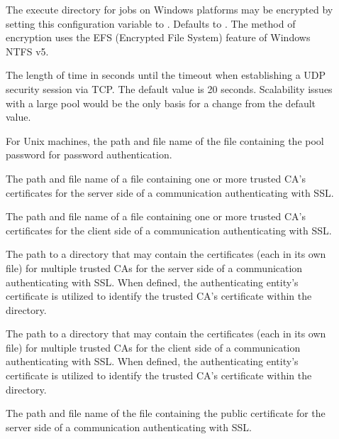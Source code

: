 \begin{description}
\item[]
\label{param:EncryptExecuteDirectory}
The execute directory for jobs on Windows platforms may be
encrypted by setting this configuration variable to .
Defaults to .
The method of encryption uses the EFS (Encrypted File System)
feature of Windows NTFS v5.

\item[]
\label{param:SecTCPSessionTimeout}
The length of time in seconds until the timeout
when establishing a UDP security session via TCP.
The default value is 20 seconds.
Scalability issues with a large pool would be the only basis
for a change from the default value.

\item[]
\label{param:SecPasswordFile} For Unix machines, the path and file name
of  the file containing the pool password for password authentication.


\item[]
\label{param:AuthSSLServerCAFile}  The path and file name of
a file containing one or more trusted CA's certificates
for the server side of a communication authenticating 
with SSL.

\item[]
\label{param:AuthSSLClientCAFile} The path and file name of
a file containing one or more trusted CA's certificates
for the client side of a communication authenticating 
with SSL.


\item[]
\label{param:AuthSSLServerCADir}  
The path to a directory that may contain the 
certificates (each in its own file) for multiple trusted CAs 
for the server side of a communication authenticating 
with SSL.
When defined, the authenticating entity's certificate 
is utilized to identify the trusted CA's certificate
within the directory.

\item[]
\label{param:AuthSSLClientCADir} 
The path to a directory that may contain the 
certificates (each in its own file) for multiple trusted CAs 
for the client side of a communication authenticating 
with SSL.
When defined, the authenticating entity's certificate 
is utilized to identify the trusted CA's certificate
within the directory.


\item[]
\label{param:AuthSSLServerCertfile}  
The path and file name of
the file containing the public certificate
for the server side of a communication authenticating
with SSL.


\end{description}
